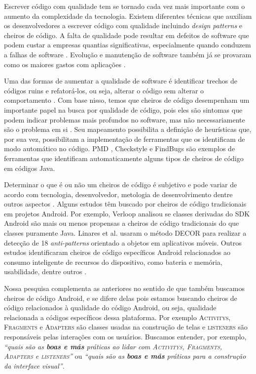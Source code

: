 Escrever c\'odigo com qualidade tem se tornado cada vez mais importante com o aumento da complexidade da tecnologia. Existem diferentes t\'ecnicas que auxiliam os desenvolvedores a escrever c\'odigo com qualidade incluindo \textit{design patterns} e cheiros de c\'odigo. A falta de qualidade pode resultar em defeitos de software que podem custar a empresas quantias significativas, especialmente quando conduzem a falhas de software \cite{Nagappan:2005, briand1993modeling}. Evolu\c{c}\~ao e manuten\c{c}\~ao de software tamb\'em j\'a se provaram como os maiores gastos com aplica\c{c}\~oes \cite{RefactoringAndImprovements:10}.

Uma das formas de aumentar a qualidade de software \'e identificar trechos de c\'odigos ruins e refator\'a-los, ou seja, alterar o c\'odigo sem alterar o comportamento \cite{Refactoring:99}. Com base nisso, temos que cheiros de c\'odigo desempenham um importante papel na busca por qualidade de c\'odigo, pois eles s\~ao sintomas que podem indicar problemas mais profundos no software, mas n\~ao necessariamente s\~ao o problema em si \cite{CodeSmell:06}. Seu mapeamento possibilita a defini\c{c}\~ao de heur\'isticas que, por sua vez, possibilitam a implementa\c{c}\~ao de ferramentas que os identificam de modo autom\'atico no c\'odigo. PMD \cite{PMD2016}, Checkstyle e FindBugs s\~ao exemplos de ferramentas que identificam automaticamente alguns tipos de cheiros de c\'odigo em c\'odigos Java.

Determinar o que \'e ou n\~ao um cheiros de c\'odigo \'e subjetivo e pode variar de acordo com tecnologia, desenvolvedor, metologia de desenvolvimento dentre outros aspectos \cite{WikiCodeSmell}. Alguns estudos t\^em buscado por cheiros de c\'odigo tradicionais em projetos Android. Por exemplo, Verloop \cite{MobileSmells:13} analisou se classes derivadas do SDK Android s\~ao mais ou menos propensas a cheiros de c\'odigo tradicionais do que classes puramente Java. Linares et al. \cite{DomainMatters} usaram o m\'etodo DECOR para realizar a detec\c{c}\~ao de 18 \textit{anti-patterns} orientado a objetos em aplicativos m\'oveis. Outros estudos identificaram cheiros de c\'odigo espec\'ificos Android relacionados ao consumo inteligente de recursos do dispositivo, como bateria e mem\'oria, usabilidade, dentre outros \cite{EnergyAndroidSmells, ReimannBrylski2013}. 

Nossa pesquisa complementa as anteriores no sentido de que tamb\'em buscamos cheiros de c\'odigo Android, e se difere delas pois estamos buscando cheiros de c\'odigo relacionados \`a qualidade do c\'odigo Android, ou seja, qualidade relacionada a c\'odigos espec\'ificos dessa plataforma. Por exemplo \textsc{Activitys}, \textsc{Fragments} e \textsc{Adapters} s\~ao classes usadas na constru\c{c}\~ao de telas e \textsc{listeners} s\~ao respons\'aveis pelas intera\c{c}\~oes com os usu\'arios. Buscamos entender, por exemplo, \textit{``quais s\~ao as \textbf{boas e m\'as} pr\'aticas ao lidar com \textsc{Activitys}, \textsc{Fragments}, \textsc{Adapters} e \textsc{listeners}''} ou \textit{``quais s\~ao as \textbf{boas e m\'as} pr\'aticas para a constru\c{c}\~ao da interface visual''}. 

